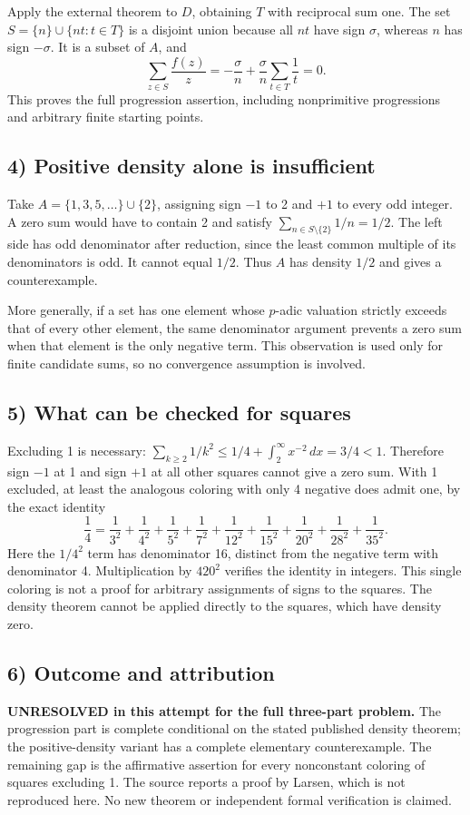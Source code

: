 Apply the external theorem to $D$, obtaining $T$ with reciprocal sum one. The set $S=\{n\}\cup\{nt:t\in T\}$ is a disjoint union because all $nt$ have sign $\sigma$, whereas $n$ has sign $-\sigma$. It is a subset of $A$, and
\[\sum_{z\in S}\frac{f(z)}z=-\frac\sigma n+\frac\sigma n\sum_{t\in T}\frac1t=0.\]
This proves the full progression assertion, including nonprimitive progressions and arbitrary finite starting points.

\subsection*{4) Positive density alone is insufficient}
Take $A=\{1,3,5,\ldots\}\cup\{2\}$, assigning sign $-1$ to 2 and $+1$ to every odd integer. A zero sum would have to contain 2 and satisfy $\sum_{n\in S\setminus\{2\}}1/n=1/2$. The left side has odd denominator after reduction, since the least common multiple of its denominators is odd. It cannot equal $1/2$. Thus $A$ has density $1/2$ and gives a counterexample.

More generally, if a set has one element whose $p$-adic valuation strictly exceeds that of every other element, the same denominator argument prevents a zero sum when that element is the only negative term. This observation is used only for finite candidate sums, so no convergence assumption is involved.

\subsection*{5) What can be checked for squares}
Excluding 1 is necessary: $\sum_{k\ge2}1/k^2\le1/4+\int_2^\infty x^{-2}\,dx=3/4<1$. Therefore sign $-1$ at 1 and sign $+1$ at all other squares cannot give a zero sum. With 1 excluded, at least the analogous coloring with only 4 negative does admit one, by the exact identity
\[\frac14=\frac1{3^2}+\frac1{4^2}+\frac1{5^2}+\frac1{7^2}+\frac1{12^2}+\frac1{15^2}+\frac1{20^2}+\frac1{28^2}+\frac1{35^2}.\]
Here the $1/4^2$ term has denominator 16, distinct from the negative term with denominator 4. Multiplication by $420^2$ verifies the identity in integers. This single coloring is not a proof for arbitrary assignments of signs to the squares. The density theorem cannot be applied directly to the squares, which have density zero.

\subsection*{6) Outcome and attribution}
\textbf{UNRESOLVED in this attempt for the full three-part problem.} The progression part is complete conditional on the stated published density theorem; the positive-density variant has a complete elementary counterexample. The remaining gap is the affirmative assertion for every nonconstant coloring of squares excluding 1. The source reports a proof by Larsen, which is not reproduced here. No new theorem or independent formal verification is claimed.

